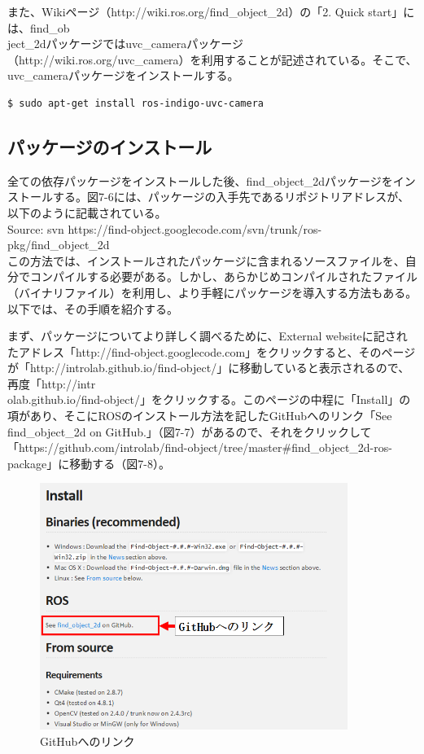 また、Wikiページ（http://wiki.ros.org/find\_object\_2d）の「2. Quick start」には、find\_ob\\ject\_2dパッケージではuvc\_cameraパッケージ（http://wiki.ros.org/uvc\_camera）を利用することが記述されている。そこで、uvc\_cameraパッケージをインストールする。

\begin{lstlisting}[language=ROS]
$ sudo apt-get install ros-indigo-uvc-camera
\end{lstlisting}

\subsection{パッケージのインストール}

全ての依存パッケージをインストールした後、find\_object\_2dパッケージをインストールする。図7-6には、パッケージの入手先であるリポジトリアドレスが、以下のように記載されている。\\

Source: svn https://find-object.googlecode.com/svn/trunk/ros-pkg/find\_object\_2d\\

この方法では、インストールされたパッケージに含まれるソースファイルを、自分でコンパイルする必要がある。しかし、あらかじめコンパイルされたファイル（バイナリファイル）を利用し、より手軽にパッケージを導入する方法もある。以下では、その手順を紹介する。

まず、パッケージについてより詳しく調べるために、External websiteに記されたアドレス「http://find-object.googlecode.com」をクリックすると、そのページが「http://introlab.github.io/find-object/」に移動していると表示されるので、再度「http://intr\\olab.github.io/find-object/」をクリックする。このページの中程に「Install」の項があり、そこにROSのインストール方法を記したGitHubへのリンク「See find\_object\_2d on GitHub.」（図7-7）があるので、それをクリックして「https://github.com/introlab/find-object/tree/master#find\_object\_2d-ros-package」に移動する（図7-8）。

\begin{figure}[htp]
  \centering
  \includegraphics[width=10cm]{pictures/chapter7/pic_07_07.png}
  \caption{GitHubへのリンク}
\end{figure}

